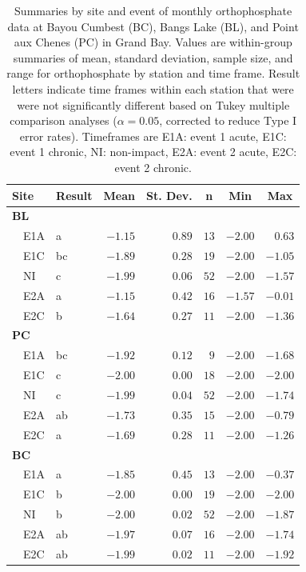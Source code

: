 \documentclass[letterpaper,12pt]{article}\usepackage[]{graphicx}\usepackage[]{color}
\begin{document}
\clearpage

\begin{table}[!tbp]
\caption{Summaries by site and event of monthly orthophosphate data at Bayou Cumbest (BC), Bangs Lake (BL), and Point aux Chenes (PC) in Grand Bay.  Values are within-group summaries of mean, standard deviation, sample size, and range for orthophosphate by station and time frame.  Result letters indicate time frames within each station that were were not significantly different based on Tukey multiple comparison analyses ($\alpha = 0.05$, corrected to reduce Type I error rates). Timeframes are E1A: event 1 acute, E1C: event 1 chronic, NI: non-impact, E2A: event 2 acute, E2C: event 2 chronic.\label{tab:orthtab}} 
\begin{center}
\begin{tabular}{llrrrrr}
\hline\hline
\multicolumn{1}{l}{Site}&\multicolumn{1}{c}{Result}&\multicolumn{1}{c}{Mean}&\multicolumn{1}{c}{St. Dev.}&\multicolumn{1}{c}{n}&\multicolumn{1}{c}{Min}&\multicolumn{1}{c}{Max}\tabularnewline
\hline
{\bfseries BL}&&&&&&\tabularnewline
~~E1A&a&$-1.15$&$0.89$&$13$&$-2.00$&$ 0.63$\tabularnewline
~~E1C&bc&$-1.89$&$0.28$&$19$&$-2.00$&$-1.05$\tabularnewline
~~NI&c&$-1.99$&$0.06$&$52$&$-2.00$&$-1.57$\tabularnewline
~~E2A&a&$-1.15$&$0.42$&$16$&$-1.57$&$-0.01$\tabularnewline
~~E2C&b&$-1.64$&$0.27$&$11$&$-2.00$&$-1.36$\tabularnewline
\hline
{\bfseries PC}&&&&&&\tabularnewline
~~E1A&bc&$-1.92$&$0.12$&$ 9$&$-2.00$&$-1.68$\tabularnewline
~~E1C&c&$-2.00$&$0.00$&$18$&$-2.00$&$-2.00$\tabularnewline
~~NI&c&$-1.99$&$0.04$&$52$&$-2.00$&$-1.74$\tabularnewline
~~E2A&ab&$-1.73$&$0.35$&$15$&$-2.00$&$-0.79$\tabularnewline
~~E2C&a&$-1.69$&$0.28$&$11$&$-2.00$&$-1.26$\tabularnewline
\hline
{\bfseries BC}&&&&&&\tabularnewline
~~E1A&a&$-1.85$&$0.45$&$13$&$-2.00$&$-0.37$\tabularnewline
~~E1C&b&$-2.00$&$0.00$&$19$&$-2.00$&$-2.00$\tabularnewline
~~NI&b&$-2.00$&$0.02$&$52$&$-2.00$&$-1.87$\tabularnewline
~~E2A&ab&$-1.97$&$0.07$&$16$&$-2.00$&$-1.74$\tabularnewline
~~E2C&ab&$-1.99$&$0.02$&$11$&$-2.00$&$-1.92$\tabularnewline
\hline
\end{tabular}\end{center}

\end{table}

\clearpage
\end{document}

